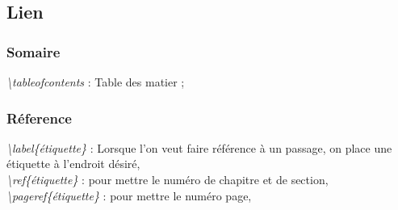\documentclass[a4paper,12pt]{report}
\begin{document}
		\subsection{Lien}
			\subsubsection{Somaire}
				\textit{\textbackslash tableofcontents} : Table des matier ;
			\subsubsection{Réference}
				\textit{\textbackslash label\{étiquette\}} : Lorsque l'on veut faire référence à un passage, on place une étiquette à l'endroit désiré,\\
				\textit{\textbackslash ref\{étiquette\}} : pour mettre le numéro de chapitre et de section,\\
				\textit{\textbackslash pageref\{étiquette\}} : pour mettre le numéro page,
\end{document}
